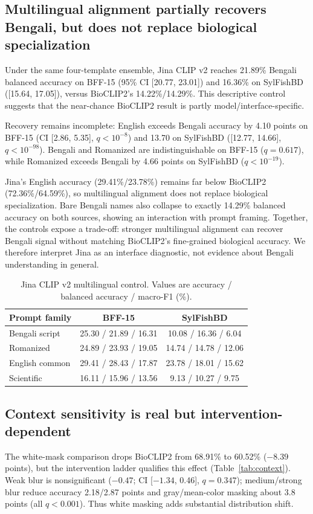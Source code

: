 \documentclass{article}
\begin{document}
\subsection{Multilingual alignment partially recovers Bengali, but does not replace biological specialization}
Under the same four-template ensemble, Jina CLIP v2 reaches 21.89\% Bengali balanced accuracy on BFF-15 (95\% CI [20.77, 23.01]) and 16.36\% on SylFishBD ([15.64, 17.05]), versus BioCLIP2's 14.22\%/14.29\%. This descriptive control suggests that the near-chance BioCLIP2 result is partly model/interface-specific.

Recovery remains incomplete: English exceeds Bengali accuracy by 4.10 points on BFF-15 (CI [2.86, 5.35], $q<10^{-8}$) and 13.70 on SylFishBD ([12.77, 14.66], $q<10^{-98}$). Bengali and Romanized are indistinguishable on BFF-15 ($q=0.617$), while Romanized exceeds Bengali by 4.66 points on SylFishBD ($q<10^{-19}$).

Jina's English accuracy (29.41\%/23.78\%) remains far below BioCLIP2 (72.36\%/64.59\%), so multilingual alignment does not replace biological specialization. Bare Bengali names also collapse to exactly 14.29\% balanced accuracy on both sources, showing an interaction with prompt framing. Together, the controls expose a trade-off: stronger multilingual alignment can recover Bengali signal without matching BioCLIP2's fine-grained biological accuracy. We therefore interpret Jina as an interface diagnostic, not evidence about Bengali understanding in general.

\begin{table}[H]
\caption{Jina CLIP v2 multilingual control. Values are accuracy / balanced accuracy / macro-F1 (\%).}
\label{tab:jina}
\centering
\small
\begin{tabular}{lcc}
\toprule
Prompt family & BFF-15 & SylFishBD \\
\midrule
Bengali script & 25.30 / 21.89 / 16.31 & 10.08 / 16.36 / 6.04 \\
Romanized & 24.89 / 23.93 / 19.05 & 14.74 / 14.78 / 12.06 \\
English common & 29.41 / 28.43 / 17.87 & 23.78 / 18.01 / 15.62 \\
Scientific & 16.11 / 15.96 / 13.56 & 9.13 / 10.27 / 9.75 \\
\bottomrule
\end{tabular}
\end{table}

\subsection{Context sensitivity is real but intervention-dependent}
The white-mask comparison drops BioCLIP2 from 68.91\% to 60.52\% ($-8.39$ points), but the intervention ladder qualifies this effect (Table~\ref{tab:context}). Weak blur is nonsignificant ($-0.47$; CI [$-1.34$, 0.46], $q=0.347$); medium/strong blur reduce accuracy 2.18/2.87 points and gray/mean-color masking about 3.8 points (all $q<0.001$). Thus white masking adds substantial distribution shift.
\end{document}

